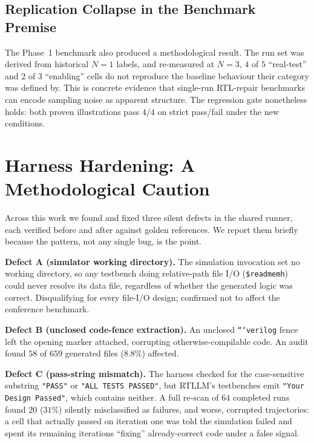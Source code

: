 \documentclass[11pt]{article}
\begin{document}
\subsection{Replication Collapse in the Benchmark Premise}
\label{sec:escalate-collapse}

The Phase~1 benchmark also produced a methodological result. The run set was
derived from historical $N{=}1$ labels, and re-measured at $N{=}3$, $4$ of $5$
``real-test'' and $2$ of $3$ ``enabling'' cells do not reproduce the baseline
behaviour their category was defined by. This is concrete evidence that
single-run RTL-repair benchmarks can encode sampling noise as apparent
structure. The regression gate nonetheless holds: both proven illustrations
pass $4/4$ on strict pass/fail under the new conditions.

\section{Harness Hardening: A Methodological Caution}
\label{sec:harness}

Across this work we found and fixed three silent defects in the shared runner,
each verified before and after against golden references. We report them
briefly because the pattern, not any single bug, is the point.

\textbf{Defect A (simulator working directory).} The simulation invocation set
no working directory, so any testbench doing relative-path file I/O
(\texttt{\$readmemh}) could never resolve its data file, regardless of whether
the generated logic was correct. Disqualifying for every file-I/O design;
confirmed not to affect the conference benchmark.

\textbf{Defect B (unclosed code-fence extraction).} An unclosed
\texttt{```verilog} fence left the opening marker attached, corrupting
otherwise-compilable code. An audit found $58$ of $659$ generated files
($8.8\%$) affected.

\textbf{Defect C (pass-string mismatch).} The harness checked for the
case-sensitive substring \texttt{"PASS"} or \texttt{"ALL TESTS PASSED"}, but
RTLLM's testbenches emit \texttt{"Your Design Passed"}, which contains
neither. A full re-scan of $64$ completed runs found $20$ ($31\%$) silently
misclassified as failures, and worse, corrupted trajectories: a cell that
actually passed on iteration one was told the simulation failed and spent its
remaining iterations ``fixing'' already-correct code under a false signal.
\end{document}

